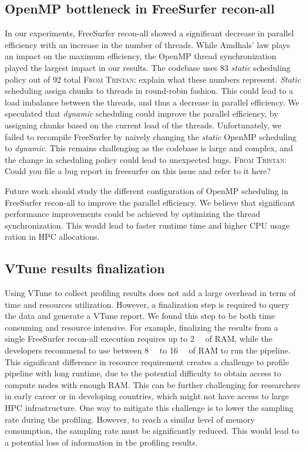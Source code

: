 \documentclass[conference]{IEEEtran}
\newcommand{\TG}[1]{\color{blue}\textsc{From Tristan: }#1\color{black}}
\begin{document}
\subsection{OpenMP bottleneck in FreeSurfer recon-all}
In our experiments, FreeSurfer recon-all showed a significant decrease in parallel efficiency with an increase in the number of threads. While Amdhals' law plays an impact on the maximum efficiency, the OpenMP thread synchronization played the largest impact in our results. The codebase uses 83 \textit{static} scheduling policy out of 92 total \TG{explain what these numbers represent}. \textit{Static} scheduling assign chunks to threads in round-robin fashion. This could lead to a load imbalance between the threads, and thus a decrease in parallel efficiency. We speculated that \textit{dynamic} scheduling could improve the parallel efficiency, by assigning chunks based on the current load of the threads. Unfortunately, we failed to recompile FreeSurfer by naively changing the \textit{static} OpenMP scheduling to \textit{dynamic}. This remains challenging as the codebase is large and complex, and the change in scheduling policy could lead to unexpected bugs. \TG{Could you file a bug report in freesurfer on this issue and refer to it here?}
			
Future work should study the different configuration of OpenMP scheduling in FreeSurfer recon-all to improve the parallel efficiency. We believe that significant performance improvements could be achieved by optimizing the thread synchronization. This would lead to faster runtime time and higher CPU usage ration in HPC allocations.
			
\subsection{VTune results finalization}
Using VTune to collect profiling results does not add a large overhead in term of time and resources utilization. However, a finalization step is required to query the data and generate a VTune report. We found this step to be both time consuming and resource intensive. For example, finalizing the results from a single FreeSurfer recon-all execution requires up to \SI{2}{\tera\byte} of RAM, while the developers recommend to use between \SI{8}{\giga\byte} to \SI{16}{\giga\byte} of RAM to run the pipeline. This significant difference in resource requirement creates a challenge to profile pipeline with long runtime, due to the potential difficulty to obtain access to compute nodes with enough RAM. This can be further challenging for researchers in early career or in developing countries, which might not have access to large HPC infrastructure.
One way to mitigate this challenge is to lower the sampling rate during the profiling. However, to reach a similar level of memory consumption, the sampling rate must be significantly reduced. This would lead to a potential loss of information in the profiling results.
\end{document}
